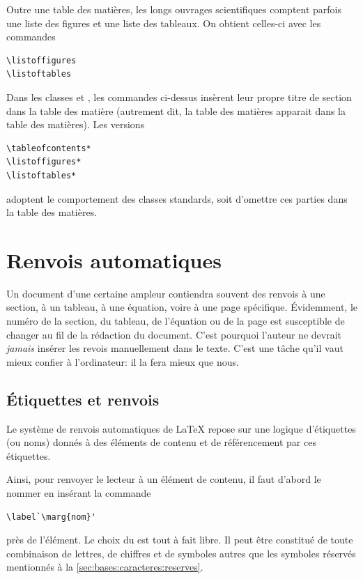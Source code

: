 Outre une table des matières, les longs ouvrages scientifiques
comptent parfois une liste des figures et une liste des tableaux. On
obtient celles-ci avec les commandes
\begin{lstlisting}
\listoffigures
\listoftables
\end{lstlisting}

Dans les classes  et , les commandes
ci-dessus insèrent leur propre titre de section dans la table des
matière (autrement dit, la table des matières apparait dans la table
des matières). Les versions
\begin{lstlisting}
\tableofcontents*
\listoffigures*
\listoftables*
\end{lstlisting}
adoptent le comportement des classes standards, soit d'omettre ces
parties dans la table des matières.


\section{Renvois automatiques}
\label{sec:organisation:renvois}

Un document d'une certaine ampleur contiendra souvent des renvois à
une section, à un tableau, à une équation, voire à une page
spécifique. Évidemment, le numéro de la section, du tableau, de
l'équation ou de la page est susceptible de changer au fil de la
rédaction du document. C'est pourquoi l'auteur ne devrait
\emph{jamais} insérer les revois manuellement dans le texte. C'est une
tâche qu'il vaut mieux confier à l'ordinateur: il la fera mieux que
nous.

\subsection{Étiquettes et renvois}
\label{sec:organisation:renvois:etiquettes}

Le système de renvois automatiques de {\LaTeX} repose sur une logique
d'étiquettes (ou noms) donnés à des éléments de contenu et de
référencement par ces étiquettes.

Ainsi, pour renvoyer le lecteur à un élément de contenu, il faut
d'abord le nommer en insérant la commande
\begin{lstlisting}
\label`\marg{nom}'
\end{lstlisting}
près de l'élément. Le choix du  est tout à fait libre. Il
peut être constitué de toute combinaison de lettres, de chiffres et de
symboles autres que les symboles réservés mentionnés à la
\autoref{sec:bases:caracteres:reserves}.

